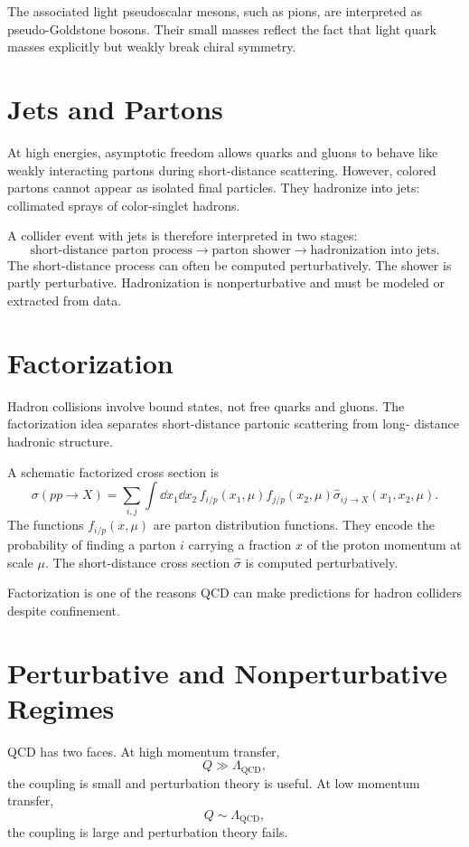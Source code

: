 The associated light pseudoscalar mesons, such as pions, are interpreted as
pseudo-Goldstone bosons. Their small masses reflect the fact that light quark
masses explicitly but weakly break chiral symmetry.

\section{Jets and Partons}

At high energies, asymptotic freedom allows quarks and gluons to behave like
weakly interacting partons during short-distance scattering. However, colored
partons cannot appear as isolated final particles. They hadronize into jets:
collimated sprays of color-singlet hadrons.

A collider event with jets is therefore interpreted in two stages:
\[
    \text{short-distance parton process}
    \longrightarrow
    \text{parton shower}
    \longrightarrow
    \text{hadronization into jets}.
\]
The short-distance process can often be computed perturbatively. The shower is
partly perturbative. Hadronization is nonperturbative and must be modeled or
extracted from data.

\section{Factorization}

Hadron collisions involve bound states, not free quarks and gluons. The
factorization idea separates short-distance partonic scattering from long-
distance hadronic structure.

A schematic factorized cross section is
\[
    \sigma(pp\to X)
    = \sum_{i,j}\int\dd x_1\dd x_2\,
      f_{i/p}(x_1,\mu)f_{j/p}(x_2,\mu)
      \hat\sigma_{ij\to X}(x_1,x_2,\mu).
\]
The functions \(f_{i/p}(x,\mu)\) are parton distribution functions. They encode
the probability of finding a parton \(i\) carrying a fraction \(x\) of the
proton momentum at scale \(\mu\). The short-distance cross section
\(\hat\sigma\) is computed perturbatively.

Factorization is one of the reasons QCD can make predictions for hadron
colliders despite confinement.

\section{Perturbative and Nonperturbative Regimes}

QCD has two faces. At high momentum transfer,
\[
    Q\gg \Lambda_{\mathrm{QCD}},
\]
the coupling is small and perturbation theory is useful. At low momentum
transfer,
\[
    Q\sim \Lambda_{\mathrm{QCD}},
\]
the coupling is large and perturbation theory fails.

